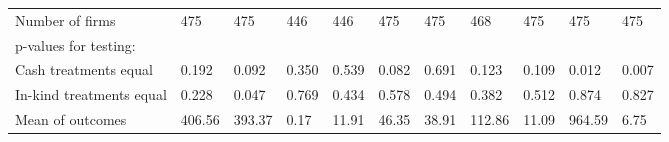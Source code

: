 \documentclass{report}
\begin{document}
\begin{table}[H]
{\begin{tabular}{lllllllllll}
\hspace{1em}Number of firms & 475 & 475 & 446 & 446 & 475 & 475 & 468 & 475 & 475 & 475\\
\hspace{1em}p-values for testing: &  &  &  &  &  &  &  &  &  & \\
\hspace{1em}\hspace{1em} Cash treatments equal & 0.192 & 0.092 & 0.350 & 0.539 & 0.082 & 0.691 & 0.123 & 0.109 & 0.012 & 0.007\\
\hspace{1em}\hspace{1em} In-kind treatments equal & 0.228 & 0.047 & 0.769 & 0.434 & 0.578 & 0.494 & 0.382 & 0.512 & 0.874 & 0.827\\
\hspace{1em}Mean of outcomes & 406.56 & 393.37 & 0.17 & 11.91 & 46.35 & 38.91 & 112.86 & 11.09 & 964.59 & 6.75\\
\bottomrule
\end{tabular}}
\end{table}
\end{document}
